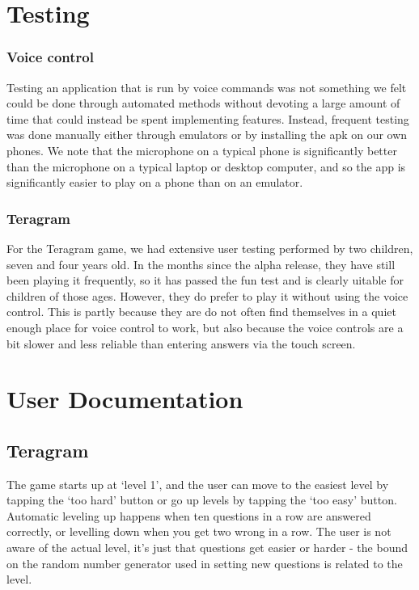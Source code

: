 \documentclass[11pt, oneside]{article}
\begin{document}
\section{Testing}

\subsubsection*{Voice control}

Testing an application that is run by voice commands was not something
we felt could be done through automated methods without devoting a
large amount of time that could instead be spent implementing
features. Instead, frequent testing was done manually either through
emulators or by installing the apk on our own phones. We note that the
microphone on a typical phone is significantly better than the
microphone on a typical laptop or desktop computer, and so the app is
significantly easier to play on a phone than on an emulator.


\subsubsection*{Teragram}

For the Teragram game, we had extensive user testing performed by two
children, seven and four years old. In the months since the alpha
release, they have still been playing it frequently, so it has passed
the fun test and is clearly uitable for children of those
ages. However, they do prefer to play it without using the voice
control. This is partly because they are do not often find themselves
in a quiet enough place for voice control to work, but also because
the voice controls are a bit slower and less reliable than entering
answers via the touch screen.

\pagebreak

\section{User Documentation}

\subsection{Teragram}

The game starts up at `level 1', and the user can move to the easiest
level by tapping the `too hard' button or go up levels by tapping the
`too easy' button. Automatic leveling up happens when ten questions in
a row are answered correctly, or levelling down when you get two wrong
in a row. The user is not aware of the actual level, it's just that
questions get easier or harder - the bound on the random number
generator used in setting new questions is related to the level.
\end{document}
